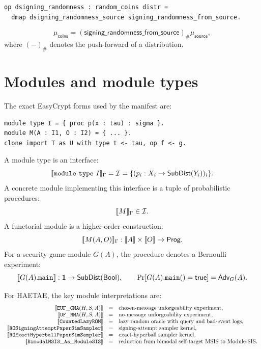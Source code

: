 \begin{lstlisting}[language=EasyCrypt]
op dsigning_randomness : random_coins distr =
  dmap dsigning_randomness_source signing_randomness_from_source.
\end{lstlisting}
\[
  \mu_{\mathsf{coins}}
  =
  (\mathsf{signing\_randomness\_from\_source})_{\#}
  \mu_{\mathsf{source}},
\]
where \((-)_{\#}\) denotes the push-forward of a distribution.

\section{Modules and module types}
\label{app:semantic-modules}

The exact EasyCrypt forms used by the manifest are:

\begin{lstlisting}[language=EasyCrypt]
module type I = { proc p(x : tau) : sigma }.
module M(A : I1, O : I2) = { ... }.
clone import T as U with type t <- tau, op f <- g.
\end{lstlisting}

A module type is an interface:
\[
  \llbracket \mathtt{module\ type}\ I \rrbracket_{\Gamma}
  =
  \mathcal{I}
  =
  \{(p_i:X_i\to\mathsf{SubDist}(Y_i))_i\}.
\]
A concrete module implementing this interface is a tuple of probabilistic
procedures:
\[
  \llbracket M \rrbracket_{\Gamma}\in\mathcal{I}.
\]
A functorial module is a higher-order construction:
\[
  \llbracket M(A,O) \rrbracket_{\Gamma}
  :
  \llbracket A \rrbracket\times\llbracket O \rrbracket
  \to
  \mathsf{Prog}.
\]
For a security game module \(G(A)\), the procedure  denotes a
Bernoulli experiment:
\[
  \llbracket G(A).\mathtt{main} \rrbracket:
  \mathbf{1}\to\mathsf{SubDist}(\mathsf{Bool}),
  \qquad
  \Pr[G(A).\mathtt{main}()=\mathsf{true}]
  =
  \mathsf{Adv}_G(A).
\]

For HAETAE, the key module interpretations are:
\[
\begin{array}{rcl}
\llbracket \mathtt{EUF\_CMA}(H,S,A) \rrbracket &=&
\text{chosen-message unforgeability experiment},\\
\llbracket \mathtt{UF\_NMA}(H,S,A) \rrbracket &=&
\text{no-message unforgeability experiment},\\
\llbracket \mathtt{CountedLazyROM} \rrbracket &=&
\text{lazy random oracle with query and bad-event logs},\\
\llbracket \mathtt{ROSigningAttemptPaperSimSampler} \rrbracket &=&
\text{signing-attempt sampler kernel},\\
\llbracket \mathtt{ROExactHyperballPaperSimSampler} \rrbracket &=&
\text{exact-hyperball sampler kernel},\\
\llbracket \mathtt{BimodalMSIS\_As\_ModuleSIS} \rrbracket &=&
\text{reduction from bimodal self-target MSIS to Module-SIS}.
\end{array}
\]

